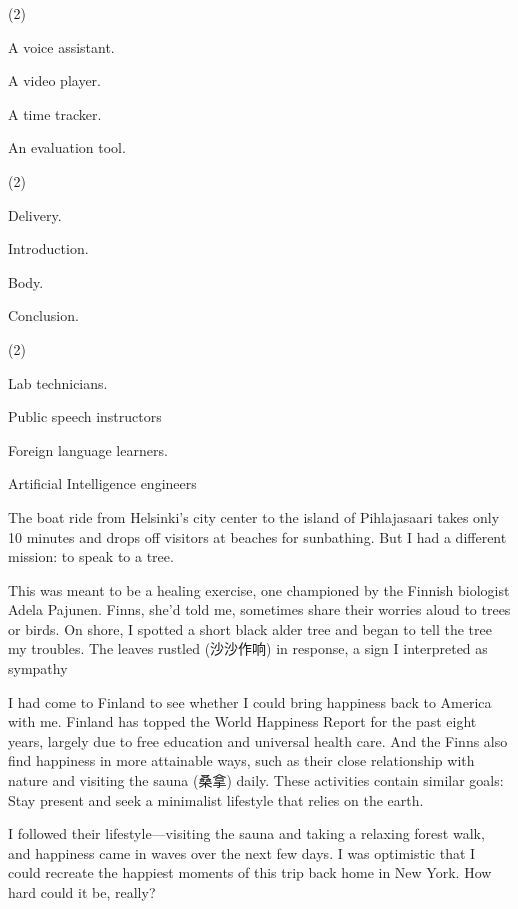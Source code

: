 \documentclass{英语试卷}
\begin{document}
\begin{choices}(2)
  \item A voice assistant.
  \item A video player.
  \item A time tracker.
  \item An evaluation tool.
\end{choices}
\begin{choices}(2)
  \item Delivery.
  \item Introduction.
  \item Body.
  \item Conclusion.
\end{choices}
\begin{choices}(2)
  \item Lab technicians.
  \item Public speech instructors
  \item Foreign language learners.
  \item Artificial Intelligence engineers
\end{choices}
\par The boat ride from Helsinki's city center to the island of Pihlajasaari takes only 10 minutes and drops off visitors at beaches for sunbathing. But I had a different mission: to speak to a tree.\par
\par This was meant to be a healing exercise, one championed by the Finnish biologist Adela Pajunen. Finns, she'd told me, sometimes share their worries aloud to trees or birds. On shore, I spotted a short black alder tree and began to tell the tree my troubles. The leaves rustled (沙沙作响) in response, a sign I interpreted as sympathy\par
\par I had come to Finland to see whether I could bring happiness back to America with me. Finland has topped the World Happiness Report for the past eight years, largely due to free education and universal health care. And the Finns also find happiness in more attainable ways, such as their close relationship with nature and visiting the sauna (桑拿) daily. These activities contain similar goals: Stay present and seek a minimalist lifestyle that relies on the earth.\par
\par I followed their lifestyle—visiting the sauna and taking a relaxing forest walk, and happiness came in waves over the next few days. I was optimistic that I could recreate the happiest moments of this trip back home in New York. How hard could it be, really?\par
\end{document}
